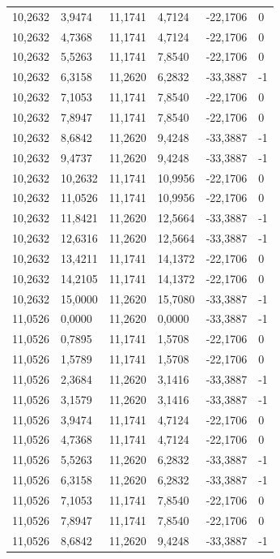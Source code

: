 \documentclass[12pt]{article}
\begin{document}
\begin{longtable}{@{}llllll@{}}
		10,2632 & 3,9474  & 11,1741 & 4,7124  & -22,1706 & 0  \\
		10,2632 & 4,7368  & 11,1741 & 4,7124  & -22,1706 & 0  \\
		10,2632 & 5,5263  & 11,1741 & 7,8540  & -22,1706 & 0  \\
		10,2632 & 6,3158  & 11,2620 & 6,2832  & -33,3887 & -1 \\
		10,2632 & 7,1053  & 11,1741 & 7,8540  & -22,1706 & 0  \\
		10,2632 & 7,8947  & 11,1741 & 7,8540  & -22,1706 & 0  \\
		10,2632 & 8,6842  & 11,2620 & 9,4248  & -33,3887 & -1 \\
		10,2632 & 9,4737  & 11,2620 & 9,4248  & -33,3887 & -1 \\
		10,2632 & 10,2632 & 11,1741 & 10,9956 & -22,1706 & 0  \\
		10,2632 & 11,0526 & 11,1741 & 10,9956 & -22,1706 & 0  \\
		10,2632 & 11,8421 & 11,2620 & 12,5664 & -33,3887 & -1 \\
		10,2632 & 12,6316 & 11,2620 & 12,5664 & -33,3887 & -1 \\
		10,2632 & 13,4211 & 11,1741 & 14,1372 & -22,1706 & 0  \\
		10,2632 & 14,2105 & 11,1741 & 14,1372 & -22,1706 & 0  \\
		10,2632 & 15,0000 & 11,2620 & 15,7080 & -33,3887 & -1 \\
		11,0526 & 0,0000  & 11,2620 & 0,0000  & -33,3887 & -1 \\
		11,0526 & 0,7895  & 11,1741 & 1,5708  & -22,1706 & 0  \\
		11,0526 & 1,5789  & 11,1741 & 1,5708  & -22,1706 & 0  \\
		11,0526 & 2,3684  & 11,2620 & 3,1416  & -33,3887 & -1 \\
		11,0526 & 3,1579  & 11,2620 & 3,1416  & -33,3887 & -1 \\
		11,0526 & 3,9474  & 11,1741 & 4,7124  & -22,1706 & 0  \\
		11,0526 & 4,7368  & 11,1741 & 4,7124  & -22,1706 & 0  \\
		11,0526 & 5,5263  & 11,2620 & 6,2832  & -33,3887 & -1 \\
		11,0526 & 6,3158  & 11,2620 & 6,2832  & -33,3887 & -1 \\
		11,0526 & 7,1053  & 11,1741 & 7,8540  & -22,1706 & 0  \\
		11,0526 & 7,8947  & 11,1741 & 7,8540  & -22,1706 & 0  \\
		11,0526 & 8,6842  & 11,2620 & 9,4248  & -33,3887 & -1 \\

\end{longtable}
\end{document}
